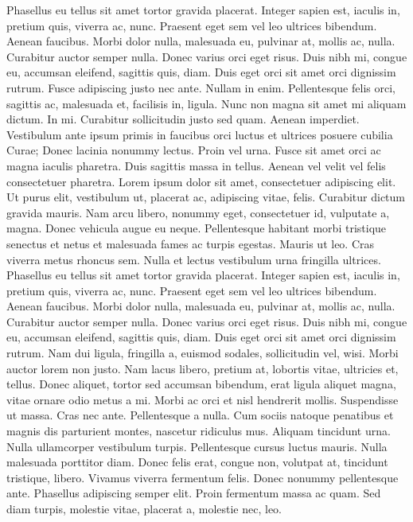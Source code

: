 \documentclass[draft,12pt,twoside,a4paper]{book}
\begin{document}
Phasellus eu tellus sit amet tortor gravida placerat.
Integer sapien est, iaculis in, pretium quis, viverra ac, nunc.
Praesent eget sem vel leo ultrices bibendum.
Aenean faucibus.
Morbi dolor nulla, malesuada eu, pulvinar at, mollis ac, nulla.
Curabitur auctor semper nulla.
Donec varius orci eget risus.
Duis nibh mi, congue eu, accumsan eleifend, sagittis quis, diam.
Duis eget orci sit amet orci dignissim rutrum.
Fusce adipiscing justo nec ante.
Nullam in enim.
Pellentesque felis orci, sagittis ac, malesuada et, facilisis in, ligula.
Nunc non magna sit amet mi aliquam dictum.
In mi.
Curabitur sollicitudin justo sed quam.
Aenean imperdiet.
Vestibulum ante ipsum primis in faucibus orci luctus et ultrices
posuere cubilia Curae; Donec lacinia nonummy lectus.
Proin vel urna.
Fusce sit amet orci ac magna iaculis pharetra.
Duis sagittis massa in tellus.
Aenean vel velit vel felis consectetuer pharetra.
Lorem ipsum dolor sit amet, consectetuer adipiscing elit.
Ut purus elit, vestibulum ut, placerat ac, adipiscing vitae, felis.
Curabitur dictum gravida mauris.
Nam arcu libero, nonummy eget, consectetuer id, vulputate a, magna.
Donec vehicula augue eu neque.
Pellentesque habitant morbi tristique senectus et netus et malesuada fames
 ac turpis egestas.
Mauris ut leo.
Cras viverra metus rhoncus sem.
Nulla et lectus vestibulum urna fringilla ultrices.
Phasellus eu tellus sit amet tortor gravida placerat.
Integer sapien est, iaculis in, pretium quis, viverra ac, nunc.
Praesent eget sem vel leo ultrices bibendum.
Aenean faucibus.
Morbi dolor nulla, malesuada eu, pulvinar at, mollis ac, nulla.
Curabitur auctor semper nulla.
Donec varius orci eget risus.
Duis nibh mi, congue eu, accumsan eleifend, sagittis quis, diam.
Duis eget orci sit amet orci dignissim rutrum.
Nam dui ligula, fringilla a, euismod sodales, sollicitudin vel, wisi.
Morbi auctor lorem non justo.
Nam lacus libero, pretium at, lobortis vitae, ultricies et, tellus.
Donec aliquet, tortor sed accumsan bibendum, erat ligula aliquet magna,
 vitae ornare odio metus a mi.
Morbi ac orci et nisl hendrerit mollis.
Suspendisse ut massa.
Cras nec ante.
Pellentesque a nulla.
Cum sociis natoque penatibus et magnis dis parturient montes,
 nascetur ridiculus mus.
Aliquam tincidunt urna.
Nulla ullamcorper vestibulum turpis.
Pellentesque cursus luctus mauris.
Nulla malesuada porttitor diam.
Donec felis erat, congue non, volutpat at, tincidunt tristique, libero.
Vivamus viverra fermentum felis.
Donec nonummy pellentesque ante.
Phasellus adipiscing semper elit.
Proin fermentum massa ac quam.
Sed diam turpis, molestie vitae, placerat a, molestie nec, leo.
\end{document}
